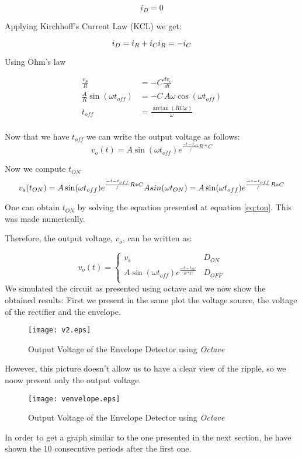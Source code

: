 \begin{equation}
  i_D=0
\end{equation}

Applying Kirchhoff's Current Law (KCL) we get:

\begin{equation}
  i_D=i_R+i_C\\
  i_R=-i_C
\end{equation}

Using Ohm's law

\begin{equation}
\begin{split}
  \frac{v_S}{R} &=-C\frac{dv_c}{dt}\\
  \frac{A}{R}\sin(\omega t_{off}) &= - C \,A \omega \cos(\omega t_{off}) \\
  t_{off} &=\frac{\arctan(RC\omega)}{\omega}\\
\end{split}
\end{equation}

Now that we have $t_{off}$ we can write the output voltage as follows:
\begin{equation}
v_o(t)=A  \sin(\omega t_{off})  e^{\frac{-t-t_{off}}/{R*C}}
\end{equation}


Now we compute $t_{ON}$
\begin{equation}
	v_s(t_{ON})=A  \sin(\omega t_{off})  e^{\frac{-t-t_{off}}/{R*C}}\\
	A sin(\omega t_{ON})=A  \sin(\omega t_{off})  e^{\frac{-t-t_{off}}/{R*C}}
\label{eq:ton}
\end{equation}

One can obtain $t_{ON}$ by solving the equation presented at equation \ref{eq:ton}. This was made numerically.

Therefore, the output voltage, $v_o$, can be written as:

\begin{equation}
	v_o(t) = \left\{
\begin{array}{ll}
	v_s & D_{ON} \\
	A  \sin(\omega t_{off})  e^{\frac{-t-t_{off}}{R*C}} & D_{OFF}\\
\end{array}
\right.
\end{equation}
We simulated the circuit as presented using octave and we now show the obtained results:
First we present in the same plot the voltage source, the voltage of the rectifier and the envelope.
\begin{figure}[H]
  \centering
  \texttt{[image: v2.eps]}
  \caption{Output Voltage of the Envelope Detector using \emph{Octave}}
  \label{fig:venvelope}
\end{figure}
However, this picture doesn't allow us to have a clear view of the ripple, so we noow present only the output voltage.
\begin{figure}[H]
  \centering
  \texttt{[image: venvelope.eps]}
  \caption{Output Voltage of the Envelope Detector using \emph{Octave}}
  \label{fig:venvelope}
\end{figure}
In order to get a graph similar to the one presented in the next section, he have shown the 10 consecutive periods after the first one.

